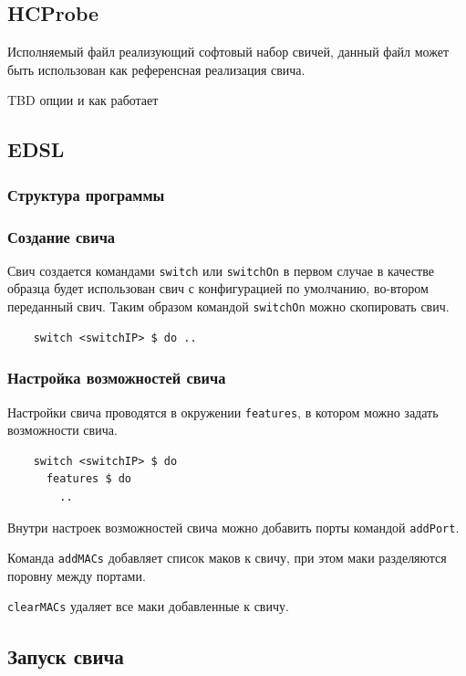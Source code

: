 \documentclass[9pt,a4paper]{article}
\begin{document}
\subsection{HCProbe}

Исполняемый файл реализующий софтовый набор свичей, данный файл может быть использован как референсная реализация свича.

TBD опции и как работает

\subsection{EDSL}
\subsubsection{Структура программы}
\subsubsection{Создание свича}
Свич создается командами \lstinline!switch! или \lstinline!switchOn! в первом случае
в качестве образца будет использован свич с конфигурацией по умолчанию, во-втором 
переданный свич. Таким образом командой \lstinline!switchOn! можно скопировать свич.

\begin{lstlisting}
    switch <switchIP> $ do ..
\end{lstlisting}

\subsubsection{Настройка возможностей свича}

Настройки свича проводятся в окружении \lstinline!features!, в котором можно задать
возможности свича.

\begin{lstlisting}
    switch <switchIP> $ do
      features $ do
        ..
\end{lstlisting}

Внутри настроек возможностей свича можно добавить порты командой \lstinline!addPort!.

Команда \lstinline!addMACs! добавляет список маков к свичу, при этом маки разделяются
поровну между портами.

\lstinline!clearMACs! удаляет все маки добавленные к свичу.


\subsection{Запуск свича}
\end{document}
